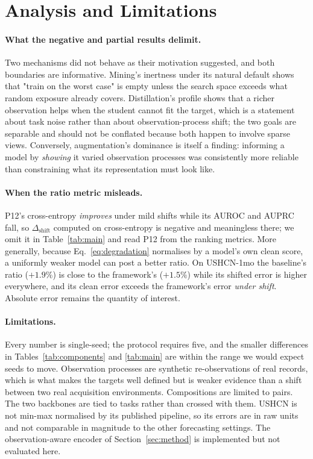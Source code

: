 
\section{Analysis and Limitations}
\label{sec:analysis}

\paragraph{What the negative and partial results delimit.}
Two mechanisms did not behave as their motivation suggested, and both boundaries are informative. Mining's
inertness under its natural default shows that "train on the worst case" is empty unless the search space
exceeds what random exposure already covers. Distillation's profile shows that a richer observation helps when
the student cannot fit the target, which is a statement about task noise rather than about observation-process
shift; the two goals are separable and should not be conflated because both happen to involve sparse views.
Conversely, augmentation's dominance is itself a finding: informing a model by \emph{showing} it varied
observation processes was consistently more reliable than constraining what its representation must look like.

\paragraph{When the ratio metric misleads.}
P12's cross-entropy \emph{improves} under mild shifts while its AUROC and AUPRC fall, so
$\Delta_{\mathrm{shift}}$ computed on cross-entropy is negative and meaningless there; we omit it in
Table~\ref{tab:main} and read P12 from the ranking metrics. More generally, because
Eq.~\ref{eq:degradation} normalises by a model's own clean score, a uniformly weaker model can post a better
ratio. On USHCN-1mo the baseline's ratio ($+1.9\%$) is close to the framework's ($+1.5\%$) while its shifted
error is higher everywhere, and its clean error exceeds the framework's error \emph{under shift}. Absolute
error remains the quantity of interest. 

\paragraph{Limitations.}
Every number is single-seed; the protocol requires five, and the smaller differences in
Tables~\ref{tab:components} and \ref{tab:main} are within the range we would expect seeds to move. Observation
processes are synthetic re-observations of real records, which is what makes the targets well defined but is
weaker evidence than a shift between two real acquisition environments. Compositions are limited to pairs. The
two backbones are tied to tasks rather than crossed with them. USHCN is not min-max normalised by its published
pipeline, so its errors are in raw units and not comparable in magnitude to the other forecasting settings. The
observation-aware encoder of Section~\ref{sec:method} is implemented but not evaluated here.
